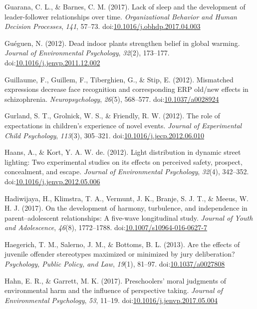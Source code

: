 \documentclass[english,man]{apa6}
\theoremstyle{definition}
\theoremstyle{definition}
\theoremstyle{definition}
\theoremstyle{remark}
\begin{document}
\hypertarget{ref-Guarana2017}{}
Guarana, C. L., \& Barnes, C. M. (2017). Lack of sleep and the
development of leader-follower relationships over time.
\emph{Organizational Behavior and Human Decision Processes}, \emph{141},
57--73.
doi:\href{https://doi.org/10.1016/j.obhdp.2017.04.003}{10.1016/j.obhdp.2017.04.003}

\hypertarget{ref-Gueguen2012}{}
Guéguen, N. (2012). Dead indoor plants strengthen belief in global
warming. \emph{Journal of Environmental Psychology}, \emph{32}(2),
173--177.
doi:\href{https://doi.org/10.1016/j.jenvp.2011.12.002}{10.1016/j.jenvp.2011.12.002}

\hypertarget{ref-Guillaume2012}{}
Guillaume, F., Guillem, F., Tiberghien, G., \& Stip, E. (2012).
Mismatched expressions decrease face recognition and corresponding ERP
old/new effects in schizophrenia. \emph{Neuropsychology}, \emph{26}(5),
568--577. doi:\href{https://doi.org/10.1037/a0028924}{10.1037/a0028924}

\hypertarget{ref-Gurland2012}{}
Gurland, S. T., Grolnick, W. S., \& Friendly, R. W. (2012). The role of
expectations in children's experience of novel events. \emph{Journal of
Experimental Child Psychology}, \emph{113}(3), 305--321.
doi:\href{https://doi.org/10.1016/j.jecp.2012.06.010}{10.1016/j.jecp.2012.06.010}

\hypertarget{ref-Haans2012}{}
Haans, A., \& Kort, Y. A. W. de. (2012). Light distribution in dynamic
street lighting: Two experimental studies on its effects on perceived
safety, prospect, concealment, and escape. \emph{Journal of
Environmental Psychology}, \emph{32}(4), 342--352.
doi:\href{https://doi.org/10.1016/j.jenvp.2012.05.006}{10.1016/j.jenvp.2012.05.006}

\hypertarget{ref-Hadiwijaya2017}{}
Hadiwijaya, H., Klimstra, T. A., Vermunt, J. K., Branje, S. J. T., \&
Meeus, W. H. J. (2017). On the development of harmony, turbulence, and
independence in parent--adolescent relationships: A five-wave
longitudinal study. \emph{Journal of Youth and Adolescence},
\emph{46}(8), 1772--1788.
doi:\href{https://doi.org/10.1007/s10964-016-0627-7}{10.1007/s10964-016-0627-7}

\hypertarget{ref-Haegerich2013}{}
Haegerich, T. M., Salerno, J. M., \& Bottoms, B. L. (2013). Are the
effects of juvenile offender stereotypes maximized or minimized by jury
deliberation? \emph{Psychology, Public Policy, and Law}, \emph{19}(1),
81--97. doi:\href{https://doi.org/10.1037/a0027808}{10.1037/a0027808}

\hypertarget{ref-Hahn2017}{}
Hahn, E. R., \& Garrett, M. K. (2017). Preschoolers' moral judgments of
environmental harm and the influence of perspective taking.
\emph{Journal of Environmental Psychology}, \emph{53}, 11--19.
doi:\href{https://doi.org/10.1016/j.jenvp.2017.05.004}{10.1016/j.jenvp.2017.05.004}
\end{document}

